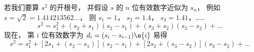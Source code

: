 
若我们要算 $s^2$ 的开根号， 并假设 $s$ 的 $n$ 位有效数字近似为 $s_n$， 例如 $s = \sqrt{2} = 1.414213562\dots$， 则 $s_1 = 1$， $s_2=1.4$， $s_3=1.41$，……
\begin{equation}
s^2 = s_1^2 + (s_2+s_1)(s_2-s_1) + (s_3+s_2)(s_3-s_2) + \dots
\end{equation}
现在， 第 $i$ 位有效数字为 $d_i = (s_i-s_{i-1}) \e{i}$ 易得
\begin{equation}
s^2 = s_1^2 + [2s_1 + (s_2-s_1)](s_2-s_1) + [2s_2 + (s_3-s_2)](s_3-s_2) + \dots
\end{equation}

